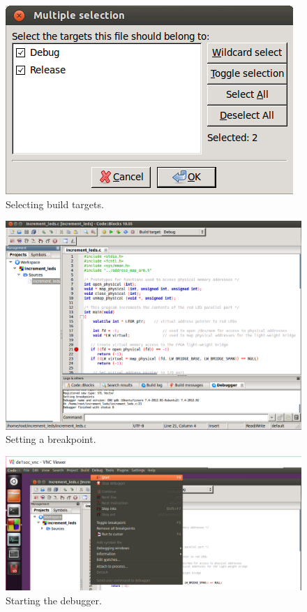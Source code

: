 \documentclass[11pt, twoside, pdftex]{article}
\begin{document}
\begin{figure} [h]
\begin{center}
\includegraphics[scale = .60]{figures/cb7.png}
\end{center}
\caption{Selecting build targets.}
\label{fig:cb7}
\end{figure}

\begin{figure} [h]
\begin{center}
\includegraphics[scale = .55]{figures/cb13.png}
\end{center}
\caption{Setting a breakpoint.}
\label{fig:cb13}
\end{figure}

\begin{figure} [h]
\begin{center}
\includegraphics[scale = .55]{figures/cb8.png}
\end{center}
\vspace{-0.5cm}\caption{Starting the debugger.}
\label{fig:cb8}
\end{figure}
\end{document}

